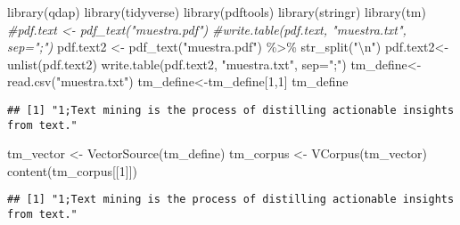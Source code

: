 \documentclass[
]{article}
\newenvironment{Shaded}{\begin{snugshade}}{\end{snugshade}}
\newcommand{\AttributeTok}[1]{\textcolor[rgb]{0.77,0.63,0.00}{#1}}
\newcommand{\CommentTok}[1]{\textcolor[rgb]{0.56,0.35,0.01}{\textit{#1}}}
\newcommand{\DecValTok}[1]{\textcolor[rgb]{0.00,0.00,0.81}{#1}}
\newcommand{\FunctionTok}[1]{\textcolor[rgb]{0.00,0.00,0.00}{#1}}
\newcommand{\NormalTok}[1]{#1}
\newcommand{\OtherTok}[1]{\textcolor[rgb]{0.56,0.35,0.01}{#1}}
\newcommand{\SpecialCharTok}[1]{\textcolor[rgb]{0.00,0.00,0.00}{#1}}
\newcommand{\StringTok}[1]{\textcolor[rgb]{0.31,0.60,0.02}{#1}}
\begin{document}
\begin{Shaded}
\begin{Highlighting}[]
\FunctionTok{library}\NormalTok{(qdap)}
\FunctionTok{library}\NormalTok{(tidyverse)}
\FunctionTok{library}\NormalTok{(pdftools)}
\FunctionTok{library}\NormalTok{(stringr)}
\FunctionTok{library}\NormalTok{(tm)}
\CommentTok{\#pdf.text \textless{}{-} pdf\_text("muestra.pdf") }
\CommentTok{\#write.table(pdf.text, "muestra.txt", sep=";")}
\NormalTok{pdf.text2 }\OtherTok{\textless{}{-}} \FunctionTok{pdf\_text}\NormalTok{(}\StringTok{"muestra.pdf"}\NormalTok{) }\SpecialCharTok{\%\textgreater{}\%} \FunctionTok{str\_split}\NormalTok{(}\StringTok{"}\SpecialCharTok{\textbackslash{}n}\StringTok{"}\NormalTok{) }
\NormalTok{pdf.text2}\OtherTok{\textless{}{-}}\FunctionTok{unlist}\NormalTok{(pdf.text2)}
\FunctionTok{write.table}\NormalTok{(pdf.text2, }\StringTok{"muestra.txt"}\NormalTok{, }\AttributeTok{sep=}\StringTok{";"}\NormalTok{)}
\NormalTok{tm\_define}\OtherTok{\textless{}{-}}\FunctionTok{read.csv}\NormalTok{(}\StringTok{"muestra.txt"}\NormalTok{)}
\NormalTok{tm\_define}\OtherTok{\textless{}{-}}\NormalTok{tm\_define[}\DecValTok{1}\NormalTok{,}\DecValTok{1}\NormalTok{]}
\NormalTok{tm\_define}
\end{Highlighting}
\end{Shaded}

\begin{verbatim}
## [1] "1;Text mining is the process of distilling actionable insights from text."
\end{verbatim}

\begin{Shaded}
\begin{Highlighting}[]
\NormalTok{tm\_vector }\OtherTok{\textless{}{-}} \FunctionTok{VectorSource}\NormalTok{(tm\_define)}
\NormalTok{tm\_corpus }\OtherTok{\textless{}{-}} \FunctionTok{VCorpus}\NormalTok{(tm\_vector)}
\FunctionTok{content}\NormalTok{(tm\_corpus[[}\DecValTok{1}\NormalTok{]])}
\end{Highlighting}
\end{Shaded}

\begin{verbatim}
## [1] "1;Text mining is the process of distilling actionable insights from text."
\end{verbatim}
\end{document}
